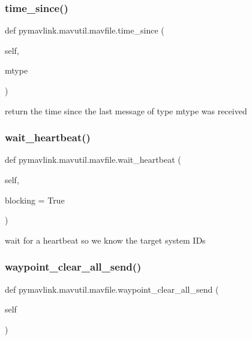 \subsubsection{\texorpdfstring{time\+\_\+since()}{time\_since()}}
{\footnotesize\ttfamily def pymavlink.\+mavutil.\+mavfile.\+time\+\_\+since (\begin{DoxyParamCaption}\item[{}]{self,  }\item[{}]{mtype }\end{DoxyParamCaption})}

\begin{DoxyVerb}return the time since the last message of type mtype was received\end{DoxyVerb}
 \mbox{\label{classpymavlink_1_1mavutil_1_1mavfile_a3776d63929d3183a65076cda4930b624}} 
\subsubsection{\texorpdfstring{wait\+\_\+heartbeat()}{wait\_heartbeat()}}
{\footnotesize\ttfamily def pymavlink.\+mavutil.\+mavfile.\+wait\+\_\+heartbeat (\begin{DoxyParamCaption}\item[{}]{self,  }\item[{}]{blocking = {\ttfamily True} }\end{DoxyParamCaption})}

\begin{DoxyVerb}wait for a heartbeat so we know the target system IDs\end{DoxyVerb}
 \mbox{\label{classpymavlink_1_1mavutil_1_1mavfile_a3c9b70e6763649129f677074bd73e41a}} 
\subsubsection{\texorpdfstring{waypoint\+\_\+clear\+\_\+all\+\_\+send()}{waypoint\_clear\_all\_send()}}
{\footnotesize\ttfamily def pymavlink.\+mavutil.\+mavfile.\+waypoint\+\_\+clear\+\_\+all\+\_\+send (\begin{DoxyParamCaption}\item[{}]{self }\end{DoxyParamCaption})}

